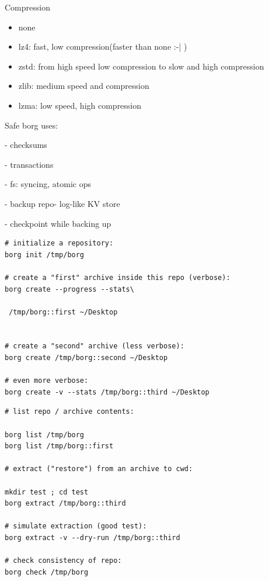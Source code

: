 \documentclass{beamer}
\begin{document}
\begin{frame}{Compression}
\begin{itemize}
	\item none
	\item lz4: fast, low compression(faster than none :-| )
	\item zstd: from high speed low compression to slow and high compression 
	\item zlib: medium speed and compression
	\item lzma: low speed, high compression
\end{itemize}
\end{frame}

\begin{frame}{Safe} 
	borg uses:
	
	- checksums
	
	- transactions
	
	- fs: syncing, atomic ops
	
	- backup repo- log-like KV store
	
	- checkpoint while backing up
	
\end{frame}

\begin{frame}[fragile]
	\begin{lstlisting}[backgroundcolor = \color{black},
		basicstyle=\color{lightgray}
			language = bash,
			framexleftmargin = 1em]
# initialize a repository:
borg init /tmp/borg

# create a "first" archive inside this repo (verbose): 
borg create --progress --stats\

 /tmp/borg::first ~/Desktop


# create a "second" archive (less verbose):
borg create /tmp/borg::second ~/Desktop

# even more verbose:
borg create -v --stats /tmp/borg::third ~/Desktop
\end{lstlisting}
\end{frame}

\begin{frame}[fragile]
	\begin{lstlisting}[backgroundcolor = \color{black},
		basicstyle=\color{lightgray}
		language = bash,
		framexleftmargin = 1em]
# list repo / archive contents:

borg list /tmp/borg
borg list /tmp/borg::first

# extract ("restore") from an archive to cwd:

mkdir test ; cd test
borg extract /tmp/borg::third

# simulate extraction (good test):
borg extract -v --dry-run /tmp/borg::third

# check consistency of repo:
borg check /tmp/borg
\end{lstlisting}
\end{frame}
\end{document}
